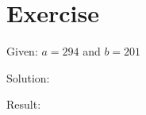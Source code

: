 \documentclass[a4paper, 10pt]{scrartcl}
\begin{document}
\section{Exercise}

Given: $a = 294$ and $b = 201$

Solution:

Result:
\[
\]
\end{document}
